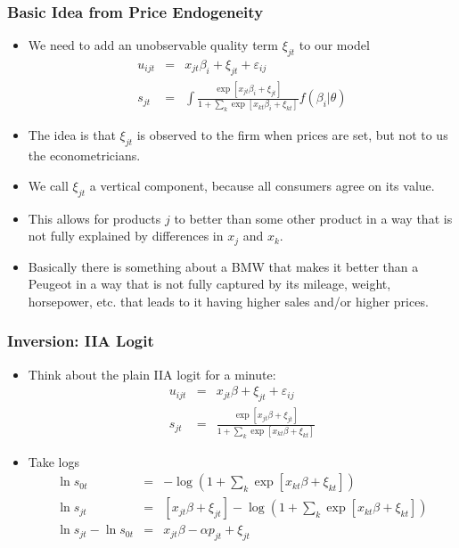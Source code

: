 \documentclass[xcolor=pdftex,dvipsnames,table,mathserif]{beamer}
\begin{document}
\begin{frame}
\frametitle{Basic Idea from Price Endogeneity}
 \begin{itemize}
\item We need to add an unobservable quality term $\xi_{jt}$ to our model
\begin{eqnarray*}
u_{ijt} &=& x_{jt} \beta_i + \xi_{jt} +  \varepsilon_{ij} \\
s_{jt} &=& \int \frac{\exp[x_{jt} \beta_i + \xi_{jt} ]}{1+\sum_k \exp[x_{kt} \beta_i + \xi_{kt} ]} f(\beta_i | \theta)
\end{eqnarray*}
\item The idea is that $\xi_{jt}$ is observed to the firm when prices are set, but not to us the econometricians.
\item We call $\xi_{jt}$ a vertical component, because all consumers agree on its value.
\item This allows for products $j$ to better than some other product in a way that is not fully explained by differences in $x_j$ and $x_k$.
\item Basically there is something about a BMW that makes it better than a Peugeot in a way that is not fully captured by its mileage, weight, horsepower, etc. that leads to it having higher sales and/or higher prices.
 \end{itemize}
\end{frame}

\begin{frame}
\frametitle{Inversion: IIA Logit}
 \begin{itemize}
\item Think about the plain IIA logit for a minute:
\begin{eqnarray*}
u_{ijt} &=& x_{jt} \beta + \xi_{jt} +  \varepsilon_{ij} \\
s_{jt} &=& \frac{\exp[x_{jt} \beta + \xi_{jt} ]}{1+\sum_k \exp[x_{kt} \beta + \xi_{kt} ]} 
\end{eqnarray*}
\item Take logs
\begin{eqnarray*}
\ln s_{0t} &=& -\log \left(1+\sum_k \exp[x_{kt} \beta + \xi_{kt}] \right) \\
\ln s_{jt} &=& [x_{jt} \beta + \xi_{jt} ] - \log \left(1+\sum_k \exp[x_{kt} \beta + \xi_{kt}] \right)\\
\ln s_{jt}- \ln s_{0t} &=& x_{jt} \beta -\alpha p_{jt} +  \xi_{jt}
\end{eqnarray*}
 \end{itemize}
\end{frame}
\end{document}
